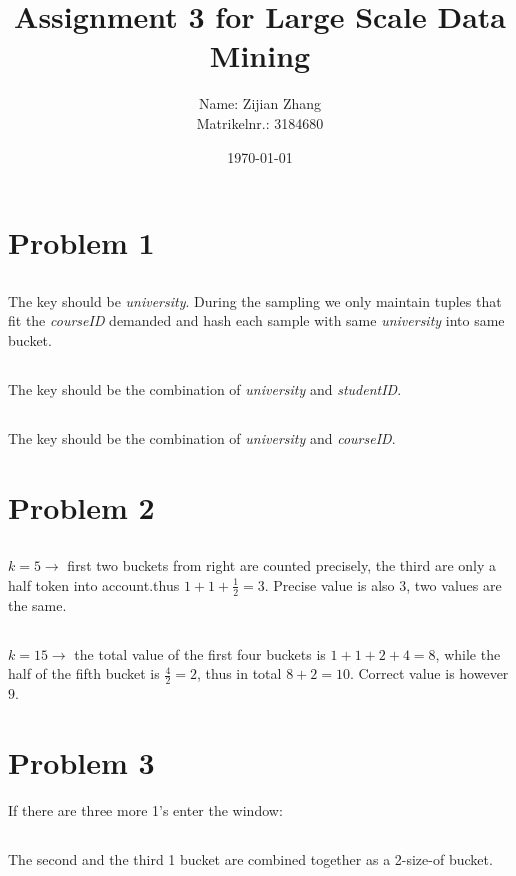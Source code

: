 \documentclass{article}
\title{Assignment 3 for Large Scale Data Mining}
\author{Name: Zijian Zhang\\
        Matrikelnr.: 3184680}
\date{\today}
\makeatletter
\renewcommand\thesubsection{\@arabic\c@subsection}
\makeatother
\begin{document}
\maketitle
\section{Problem 1}
\subsection{}
The key should be \emph{university}. During the sampling we only maintain tuples that fit the \emph{courseID} demanded and hash each sample with same \emph{university} into same bucket.
\subsection{}
The key should be the combination of \emph{university} and \emph{studentID}.
\subsection{}
The key should be the combination of \emph{university} and \emph{courseID}.
\section{Problem 2}
\renewcommand{\thesubsection}{(\alph{subsection})}
\subsection{}$k=5 \longrightarrow$ first two buckets from right are counted precisely, the third are only a half token into account.thus $1+1+\frac{1}{2}=3$. Precise value is also $3$, two values are the same.
\subsection{}$k=15 \longrightarrow$ the total value of the first four buckets is $1+1+2+4=8$, while the half of the fifth bucket is $\frac{4}{2}=2$, thus in total $8+2=10$. Correct value is however $9$.
\section{Problem 3}
If there are three more 1's enter the window:
\renewcommand{\thesubsection}{step \arabic{subsection}:}
\subsection{}The second and the third 1 bucket are combined together as a 2-size-of bucket.
\end{document}
